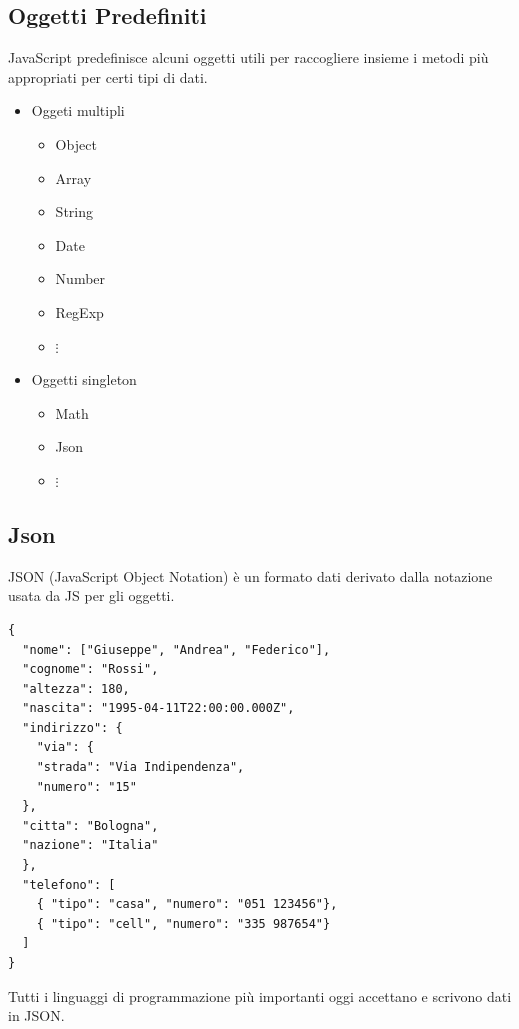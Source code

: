 \documentclass[a4paper,12pt]{article}
\begin{document}
\subsection{Oggetti Predefiniti}
JavaScript predefinisce alcuni oggetti utili per raccogliere insieme i metodi più appropriati per certi tipi di dati.
\begin{itemize}
  \item Oggeti multipli
  \begin{itemize}
    \item Object
    \item Array
    \item String
    \item Date
    \item Number 
    \item RegExp
    \item $\vdots$
  \end{itemize}
  \item Oggetti singleton
  \begin{itemize}
    \item Math
    \item Json
    \item $\vdots$
  \end{itemize}
\end{itemize}
\subsection{Json}
JSON (JavaScript Object Notation) è un formato dati derivato dalla notazione usata da JS per gli oggetti.
\begin{lstlisting}
{
  "nome": ["Giuseppe", "Andrea", "Federico"],
  "cognome": "Rossi",
  "altezza": 180,
  "nascita": "1995-04-11T22:00:00.000Z",
  "indirizzo": {
    "via": {
    "strada": "Via Indipendenza",
    "numero": "15"
  },
  "citta": "Bologna",
  "nazione": "Italia"
  },
  "telefono": [
    { "tipo": "casa", "numero": "051 123456"},
    { "tipo": "cell", "numero": "335 987654"}
  ]
}
\end{lstlisting}
Tutti i linguaggi di programmazione più importanti oggi accettano e scrivono dati in JSON.
\vspace{1em} \\
\end{document}
